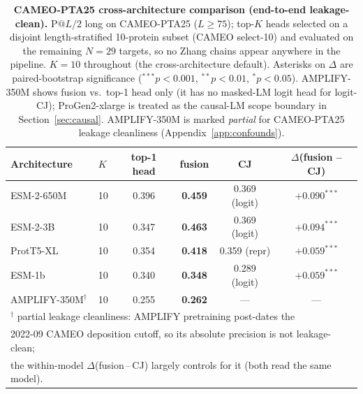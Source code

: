 \documentclass{article}
\begin{document}
\begin{table}[t]
\centering
\small
\caption{\textbf{CAMEO-PTA25 cross-architecture comparison
(end-to-end leakage-clean).}
$\text{P}@L/2$ long on CAMEO-PTA25 ($L \geq 75$); top-$K$ heads
selected on a disjoint length-stratified 10-protein subset (CAMEO
select-10) and evaluated on the remaining $N{=}29$ targets, so no
Zhang chains appear anywhere in the pipeline. $K{=}10$ throughout
(the cross-architecture default). Asterisks on $\Delta$ are
paired-bootstrap significance ($^{***}p{<}0.001$, $^{**}p{<}0.01$,
$^*p{<}0.05$). AMPLIFY-350M shows fusion vs.\ top-1 head only (it
has no masked-LM logit head for logit-CJ); ProGen2-xlarge is
treated as the causal-LM scope boundary in
Section~\ref{sec:causal}. AMPLIFY-350M is marked \emph{partial} for
CAMEO-PTA25 leakage cleanliness (Appendix~\ref{app:confounds}).}
\label{tab:cameo-crossarch}
\begin{tabular}{llcccc}
\toprule
Architecture & $K$ & top-1 head & fusion & CJ & $\Delta$(fusion -- CJ) \\
\midrule
ESM-2-650M    & 10 & 0.396 & \textbf{0.459} & 0.369 (logit) & $+0.090^{***}$ \\
ESM-2-3B      & 10 & 0.347 & \textbf{0.463} & 0.369 (logit) & $+0.094^{***}$ \\
ProtT5-XL     & 10 & 0.354 & \textbf{0.418} & 0.359 (repr)  & $+0.059^{***}$ \\
ESM-1b        & 10 & 0.340 & \textbf{0.348} & 0.289 (logit) & $+0.059^{***}$ \\
AMPLIFY-350M$^{\dagger}$  & 10 & 0.255 & \textbf{0.262} & ---           & ---            \\
\bottomrule
\multicolumn{6}{l}{\footnotesize $^{\dagger}$ partial leakage cleanliness: AMPLIFY pretraining post-dates the} \\
\multicolumn{6}{l}{\footnotesize \phantom{$^{\dagger}$ }2022-09 CAMEO deposition cutoff, so its absolute precision is not leakage-clean;} \\
\multicolumn{6}{l}{\footnotesize \phantom{$^{\dagger}$ }the within-model $\Delta$(fusion\,--\,CJ) largely controls for it (both read the same model).} \\
\end{tabular}
\end{table}
\end{document}

